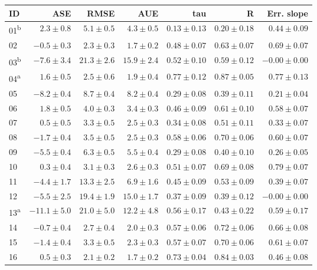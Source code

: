 \begin{tabular}{l r r r r r r}
\hline
ID & ASE & RMSE & AUE & tau & R & Err. slope \\ 
\hline
01\textsuperscript{b} & $2.3 \pm 0.8$ & $5.1 \pm 0.5$ & $4.3 \pm 0.5$ & $0.13 \pm 0.13$ & $0.20 \pm 0.18$ & $0.44 \pm 0.09$ \\ 
02 & $-0.5 \pm 0.3$ & $2.3 \pm 0.3$ & $1.7 \pm 0.2$ & $0.48 \pm 0.07$ & $0.63 \pm 0.07$ & $0.69 \pm 0.07$ \\ 
03\textsuperscript{b} & $-7.6 \pm 3.4$ & $21.3 \pm 2.6$ & $15.9 \pm 2.4$ & $0.52 \pm 0.10$ & $0.59 \pm 0.12$ & $-0.00 \pm 0.00$ \\ 
04\textsuperscript{a} & $1.6 \pm 0.5$ & $2.5 \pm 0.6$ & $1.9 \pm 0.4$ & $0.77 \pm 0.12$ & $0.87 \pm 0.05$ & $0.77 \pm 0.13$ \\ 
05 & $-8.2 \pm 0.4$ & $8.7 \pm 0.4$ & $8.2 \pm 0.4$ & $0.29 \pm 0.08$ & $0.39 \pm 0.11$ & $0.21 \pm 0.04$ \\ 
06 & $1.8 \pm 0.5$ & $4.0 \pm 0.3$ & $3.4 \pm 0.3$ & $0.46 \pm 0.09$ & $0.61 \pm 0.10$ & $0.58 \pm 0.07$ \\ 
07 & $0.5 \pm 0.5$ & $3.3 \pm 0.5$ & $2.5 \pm 0.3$ & $0.34 \pm 0.08$ & $0.51 \pm 0.11$ & $0.33 \pm 0.07$ \\ 
08 & $-1.7 \pm 0.4$ & $3.5 \pm 0.5$ & $2.5 \pm 0.3$ & $0.58 \pm 0.06$ & $0.70 \pm 0.06$ & $0.60 \pm 0.07$ \\ 
09 & $-5.5 \pm 0.4$ & $6.3 \pm 0.5$ & $5.5 \pm 0.4$ & $0.29 \pm 0.08$ & $0.40 \pm 0.10$ & $0.26 \pm 0.05$ \\ 
10 & $0.3 \pm 0.4$ & $3.1 \pm 0.3$ & $2.6 \pm 0.3$ & $0.51 \pm 0.07$ & $0.69 \pm 0.08$ & $0.79 \pm 0.07$ \\ 
11 & $-4.4 \pm 1.7$ & $13.3 \pm 2.5$ & $6.9 \pm 1.6$ & $0.45 \pm 0.09$ & $0.53 \pm 0.09$ & $0.39 \pm 0.07$ \\ 
12 & $-5.5 \pm 2.5$ & $19.4 \pm 1.9$ & $15.0 \pm 1.7$ & $0.37 \pm 0.09$ & $0.39 \pm 0.12$ & $-0.00 \pm 0.00$ \\ 
13\textsuperscript{a} & $-11.1 \pm 5.0$ & $21.0 \pm 5.0$ & $12.2 \pm 4.8$ & $0.56 \pm 0.17$ & $0.43 \pm 0.22$ & $0.59 \pm 0.17$ \\ 
14 & $-0.7 \pm 0.4$ & $2.7 \pm 0.4$ & $2.0 \pm 0.3$ & $0.57 \pm 0.06$ & $0.72 \pm 0.06$ & $0.66 \pm 0.08$ \\ 
15 & $-1.4 \pm 0.4$ & $3.3 \pm 0.5$ & $2.3 \pm 0.3$ & $0.57 \pm 0.07$ & $0.70 \pm 0.06$ & $0.61 \pm 0.07$ \\ 
16 & $0.5 \pm 0.3$ & $2.1 \pm 0.2$ & $1.7 \pm 0.2$ & $0.73 \pm 0.04$ & $0.84 \pm 0.03$ & $0.46 \pm 0.08$ \\ 

\end{tabular}
